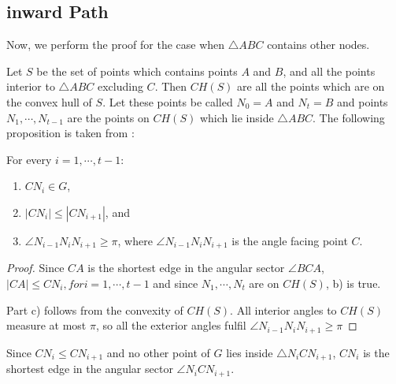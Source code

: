  
%
%




\subsection{inward Path}
Now, we perform the proof for the case when $\triangle{ABC} $ contains other nodes.

Let $S $ be the set of points which contains points $A $ and $B $, and all the points interior to $\triangle{ABC} $ excluding $C $.
Then $CH(S) $ are all the points which are on the convex hull of $S $.
Let these points be called $N_0=A $ and $N_t=B $ and points $N_1 , \cdots ,N_{t-1} $ are the points on $CH(S) $ which lie inside $\triangle{ABC} $. 
The following proposition is taken from \cite{kanj}:
\begin{prop}
\label{inward_pre}
For every $i=1, \cdots, t-1: $
\begin{enumerate}
\renewcommand{\labelenumi}{\alph{enumi})}
\item $CN_i \in G $,
\item $|CN_i| \leq |CN_{i+1}| $, and
\item  $\angle{N_{i-1}N_iN_{i+1}} \geq \pi $, where $\angle{N_{i-1}N_iN_{i+1}} $ is the angle facing point $C $.
\end{enumerate} 
\end{prop}
\begin{proof}
Since $CA $ is the shortest edge in the angular sector $\angle{BCA} $, $|CA| \leq CN_i , for i=1 ,\cdots, t-1 $  and since $N_1 , \cdots, N_t $ are on $CH(S) $, b) is true.

Part c) follows from the convexity of $CH(S) $. All interior angles to $CH(S) $ measure at most $\pi $, so all the exterior angles fulfil $\angle{N_{i-1}N_iN_{i+1}}\geq \pi $ 
\end{proof}

Since $CN_i \leq CN_{i+1} $ and no other point of $G $ lies inside $\triangle{N_iCN_{i+1}} $, $CN_i $ is the shortest edge in the angular sector $\angle{N_iCN_{i+1}} $.